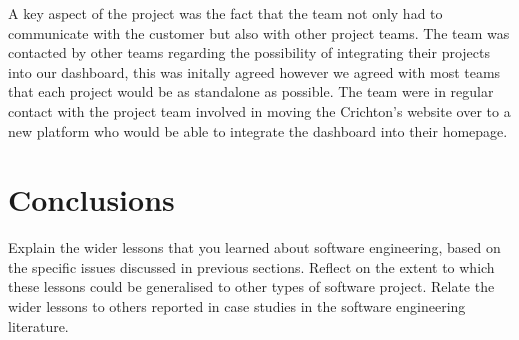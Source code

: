 \documentclass{l3proj}
\begin{document}
A key aspect of the project was the fact that the team not only had to communicate with the customer but also with
other project teams. The team was contacted by other teams regarding the possibility of integrating their projects into
our dashboard, this was initally agreed however we agreed with most teams that each project would be as standalone as
possible. The team were in regular contact with the project team involved in moving the Crichton's website over to a
new platform who would be able to integrate the dashboard into their homepage.


\section{Conclusions}
\label{sec:conclusions}

Explain the wider lessons that you learned about software engineering,
based on the specific issues discussed in previous sections.  Reflect
on the extent to which these lessons could be generalised to other
types of software project.  Relate the wider lessons to others
reported in case studies in the software engineering literature.




\end{document}
